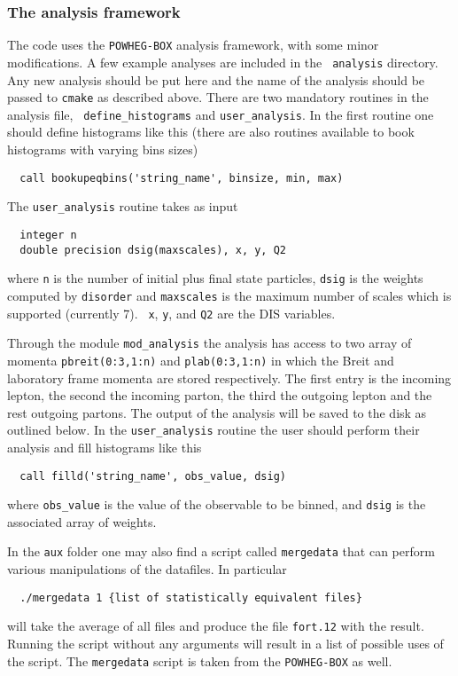 \documentclass[submission, PhysCodeb]{SciPost_better_arXiv}
\newcommand{\disorder}{{\tt disorder}}
\begin{document}
\subsubsection{The analysis framework}
The code uses the {\tt POWHEG-BOX} analysis framework, with some minor
modifications. A few example analyses are included in the {\tt
  analysis} directory. Any new analysis should be put here and the
name of the analysis should be passed to {\tt cmake} as described
above. There are two mandatory routines in the analysis file, {\tt
  define\_histograms} and {\tt user\_analysis}. In the first routine
one should define histograms like this (there are also routines
available to book histograms with varying bins sizes)
\begin{lstlisting}
  call bookupeqbins('string_name', binsize, min, max)
\end{lstlisting}
The {\tt user\_analysis} routine takes as input
\begin{lstlisting}
  integer n
  double precision dsig(maxscales), x, y, Q2
\end{lstlisting}
where {\tt n} is the number of initial plus final state particles,
{\tt dsig} is the weights computed by \disorder{} and {\tt maxscales}
is the maximum number of scales which is supported (currently 7). {\tt
  x}, {\tt y}, and {\tt Q2} are the DIS variables.

Through the module {\tt mod\_analysis} the analysis has access to two
array of momenta {\tt pbreit(0:3,1:n)} and {\tt plab(0:3,1:n)} in
which the Breit and laboratory frame momenta are stored
respectively. The first entry is the incoming lepton, the second the
incoming parton, the third the outgoing lepton and the rest outgoing
partons. The output of the analysis will be saved to the disk as
outlined below.  In the {\tt user\_analysis} routine the user should
perform their analysis and fill histograms like this
\begin{lstlisting}
  call filld('string_name', obs_value, dsig)
\end{lstlisting}
where {\tt obs\_value} is the value of the observable to be binned, and
{\tt dsig} is the associated array of weights. 

In the {\tt aux} folder one may also find a
script called {\tt mergedata} that can perform various manipulations
of the datafiles. In particular
\begin{lstlisting}
  ./mergedata 1 {list of statistically equivalent files}
\end{lstlisting}
will take the average of all files and produce the file {\tt fort.12}
with the result. Running the script without any arguments will result
in a list of possible uses of the script. The {\tt mergedata} script
is taken from the {\tt POWHEG-BOX} as well.
\end{document}

